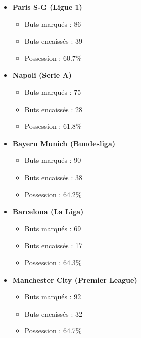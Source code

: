 \documentclass[
]{article}
\providecommand{\tightlist}{%
  \setlength{\itemsep}{0pt}\setlength{\parskip}{0pt}}
\begin{document}
\begin{itemize}
\tightlist
\item
  \textbf{Paris S-G (Ligue 1)}

  \begin{itemize}
  \tightlist
  \item
    Buts marqués : 86
  \item
    Buts encaissés : 39
  \item
    Possession : 60.7\%
  \end{itemize}
\item
  \textbf{Napoli (Serie A)}

  \begin{itemize}
  \tightlist
  \item
    Buts marqués : 75
  \item
    Buts encaissés : 28
  \item
    Possession : 61.8\%
  \end{itemize}
\item
  \textbf{Bayern Munich (Bundesliga)}

  \begin{itemize}
  \tightlist
  \item
    Buts marqués : 90
  \item
    Buts encaissés : 38
  \item
    Possession : 64.2\%
  \end{itemize}
\item
  \textbf{Barcelona (La Liga)}

  \begin{itemize}
  \tightlist
  \item
    Buts marqués : 69
  \item
    Buts encaissés : 17
  \item
    Possession : 64.3\%
  \end{itemize}
\item
  \textbf{Manchester City (Premier League)}

  \begin{itemize}
  \tightlist
  \item
    Buts marqués : 92
  \item
    Buts encaissés : 32
  \item
    Possession : 64.7\%
  \end{itemize}
\end{itemize}
\end{document}
